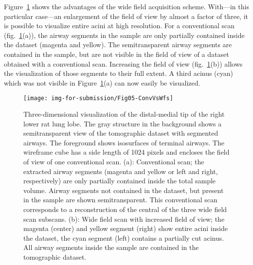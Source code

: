 Figure~\ref{fig:s2-wfs} shows the advantages of the wide field acquisition scheme. With---in this particular case---an enlargement of the field of view by almost a factor of three, it is possible to visualize entire acini at high resolution. For a conventional scan (fig.~\ref{fig:s2-wfs}(a)), the airway segments in the sample are only partially contained inside the dataset (magenta and yellow). The semitransparent airway segments are contained in the sample, but are not visible in the field of view of a dataset obtained with a conventional scan. Increasing the field of view (fig.~\ref{fig:s2-wfs}(b)) allows the visualization of those segments to their full extent. A third acinus (cyan) which was not visible in Figure~\ref{fig:s2-wfs}(a) can now easily be visualized.

\begin{figure}
	\centering
	\caption{Three-dimensional visualization of the distal-medial tip of the right lower rat lung lobe. The gray structure in the background shows a semitransparent view of the tomographic dataset with segmented airways. The foreground shows isosurfaces of terminal airways. The wireframe cube has a side length of 1024 pixels and encloses the field of view of one conventional scan. %
	(a): Conventional scan; the extracted airway segments (magenta and yellow or left and right, respectively) are only partially contained inside the total sample volume. Airway segments not contained in the dataset, but present in the sample are shown semitransparent. This conventional scan corresponds to a reconstruction of the central of the three wide field scan subscans. %
	(b): Wide field scan with increased field of view; the magenta (center) and yellow segment (right) show entire acini inside the dataset, the cyan segment (left) contains a partially cut acinus. All airway segments inside the sample are contained in the tomographic dataset.}
	\texttt{[image: img-for-submission/Fig05-ConvVsWfs]}
	\label{fig:s2-wfs}
\end{figure}


